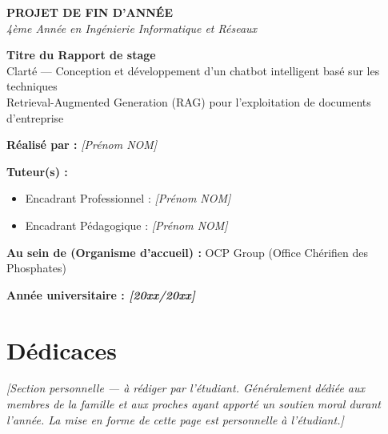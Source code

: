 \documentclass[12pt,a4paper]{report}
\newcommand{\note}[1]{\textit{[#1]}}
\begin{document}
\begin{titlepage}
\begin{flushleft}
\textbf{\Large PROJET DE FIN D'ANNÉE}\\
\textit{4ème Année en Ingénierie Informatique et Réseaux}
\end{flushleft}

\vspace{2cm}
\begin{center}
{\Huge\bfseries Titre du Rapport de stage}\\[0.3cm]
{\Large Clarté — Conception et développement d'un chatbot intelligent basé sur les techniques\\
Retrieval-Augmented Generation (RAG) pour l'exploitation de documents d'entreprise}
\end{center}

\vspace{3cm}
\noindent\textbf{Réalisé par :} \note{Prénom NOM}

\vspace{1cm}
\noindent\textbf{Tuteur(s) :}
\begin{itemize}[leftmargin=2cm]
  \item[] Encadrant Professionnel : \note{Prénom NOM}
  \item[] Encadrant Pédagogique : \note{Prénom NOM}
\end{itemize}

\vspace{1cm}
\noindent\textbf{Au sein de (Organisme d'accueil) :} OCP Group (Office Chérifien des Phosphates)

\vfill
\begin{center}
\textbf{Année universitaire : \note{20xx/20xx}}
\end{center}
\end{titlepage}

\chapter*{Dédicaces}
\note{Section personnelle — à rédiger par l'étudiant. Généralement dédiée aux membres de la famille et aux proches ayant apporté un soutien moral durant l'année. La mise en forme de cette page est personnelle à l'étudiant.}
\end{document}
